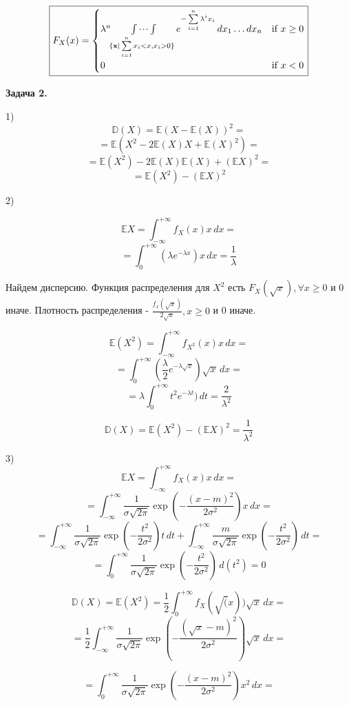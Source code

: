 \documentclass[12pt]{article}
\begin{document}
\begin{equation*}
\boxed{
F_{X}(x) = 
 \begin{cases}
    \lambda^n\idotsint\limits_{\{\textbf{x}|\sum\limits_{i=1}^nx_i<x, x_i>0\}} e^{-\sum\limits_{i=1}^n\lambda^ix_i}\,dx_1\dots dx_n &\text{if  $x \geq 0$}\\
   0 &\text{if $x<0$}
 \end{cases}
 }
\end{equation*}

\begin{center}
\textbf{Задача 2.}
\end{center}

1)
$$\mathbb{D}(X) = \mathbb{E}(X - \mathbb{E}(X))^2 = $$
$$=\mathbb{E}(X^2 - 2\mathbb{E}(X)X + \mathbb{E}(X)^2) = $$
$$= \mathbb{E}(X^2) - 2\mathbb{E}(X)\mathbb{E}(X) + (\mathbb{E}X)^2 = $$
$$= \mathbb{E}(X^2) - (\mathbb{E}X)^2$$

2)

$$\mathbb{E}X = \int_{-\infty}^{+\infty}f_X(x)x\,dx = $$
$$= \int_{0}^{+\infty}(\lambda e^{-\lambda x})x\,dx  = \frac{1}{\lambda}$$

Найдем дисперсию. Функция распределения для $X^2$ есть $F_X(\sqrt{x}), \forall x \geq 0$ и 0 иначе. Плотность распределения - $\frac{f_x(\sqrt{x})}{2\sqrt{x}}, x \geq 0$ и 0 иначе.

$$\mathbb{E}(X^2) = \int_{-\infty}^{+\infty}f_{X^2}(x)x\,dx = $$
$$= \int_{0}^{+\infty}(\frac{\lambda}{2} e^{-\lambda \sqrt{x}})\sqrt{x}\,dx =$$
$$= \lambda\int_{0}^{+\infty}t^2e^{-\lambda t})\,dt = \frac{2}{\lambda^2}$$


$$\mathbb{D}(X) = \mathbb{E}(X^2) - (\mathbb{E}X)^2 = \frac{1}{\lambda^2}$$

3) 
$$\mathbb{E}X = \int_{-\infty}^{+\infty}f_X(x)x\,dx = $$
$$= \int_{-\infty}^{+\infty}\frac{1}{\sigma \sqrt{2\pi}}\exp\left(-\frac{(x - m)^2}{2\sigma^2}\right)x\,dx  = $$
$$=\int_{-\infty}^{+\infty}\frac{1}{\sigma \sqrt{2\pi}}\exp\left(-\frac{t^2}{2\sigma^2}\right)t\,dt+\int_{-\infty}^{+\infty}\frac{m}{\sigma \sqrt{2\pi}}\exp\left(-\frac{t^2}{2\sigma^2}\right)\,dt=$$
$$= \int_{0}^{+\infty}\frac{1}{\sigma \sqrt{2\pi}}\exp\left(-\frac{t^2}{2\sigma^2}\right)\,d(t^2) = 0$$

$$\mathbb{D}(X) = \mathbb{E}(X^2) = \frac{1}{2}\int_{0}^{+\infty}f_X(\sqrt(x))\sqrt{x}\,dx = $$
$$= \frac{1}{2}\int_{-\infty}^{+\infty}\frac{1}{\sigma \sqrt{2\pi}}\exp\left(-\frac{(\sqrt{x} - m)^2}{2\sigma^2}\right)\sqrt{x}\,dx =$$

$$= \int_{0}^{+\infty}\frac{1}{\sigma \sqrt{2\pi}}\exp\left(-\frac{(x - m)^2}{2\sigma^2}\right)x^2\,dx = $$
\end{document}
